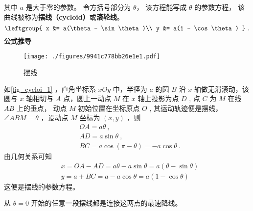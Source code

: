 
\begin{issues}
\issueDraft
\end{issues}

其中 $a$ 是大于零的参数。 令方括号部分为 $\theta$， 该方程能写成 $\theta$ 的参数方程， 该曲线被称为\textbf{摆线（cycloid）}或\textbf{滚轮线}。 %
\begin{equation}
\leftgroup{
x &= a(\theta - \sin\theta)\\
y &= a(1 - \cos\theta)
}~.\end{equation}
\textbf{公式推导}
\begin{figure}[ht]
\centering
\texttt{[image: ./figures/9941c778bb26e1e1.pdf]}
\caption{摆线} \label{fig_cycloi_1}
\end{figure}
如\autoref{fig_cycloi_1} ，直角坐标系 $xOy$ 中，半径为 $a$ 的圆 $B$ 沿 $x$ 轴做无滑滚动，该圆与 $x$ 轴相切与 $A$ 点，圆上一动点 $M$ 在 $x$ 轴上投影为点 $D$ , 点 $C$ 为 $M$ 在线 $AB$ 上的垂点， 动点 $M$ 初始位置在坐标原点 $O$ , 其运动轨迹便是摆线， $\angle ABM=\theta$ ，设动点 $M$ 坐标为 $(x,y)$ ，则
\begin{equation}
\begin{aligned}
&OA=a\theta ~,\\
&AD=a\sin\theta~,\\
&BC=a\cos(\pi-\theta)=-a \cos\theta~.
\end{aligned}
\end{equation}
由几何关系可知
\begin{equation}
\begin{aligned}
&x=OA-AD=a\theta-a\sin\theta=a(\theta-\sin\theta)\\
&y=a+BC=a-a\cos\theta=a(1-\cos\theta)
\end{aligned}
\end{equation}
这便是摆线的参数方程。


从 $\theta = 0$ 开始的任意一段摆线都是连接这两点的最速降线。 
